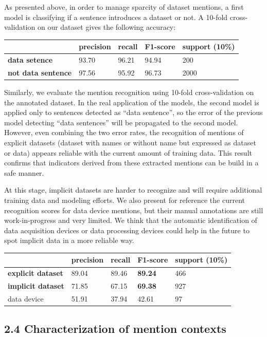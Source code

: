 \documentclass[
]{article}
\begin{document}
As presented above, in order to manage sparcity of dataset mentions, a
first model is classifying if a sentence introduces a dataset or not. A
10-fold cross-validation on our dataset gives the following accuracy:

\begin{longtable}[]{@{}lllll@{}}
\toprule
& precision & recall & \textbf{F1-score} & support (10\%)\tabularnewline
\midrule
\endhead
\textbf{data setence} & 93.70 & 96.21 & 94.94 & 200\tabularnewline
\textbf{not data sentence} & 97.56 & 95.92 & 96.73 & 2000\tabularnewline
\bottomrule
\end{longtable}

Similarly, we evaluate the mention recognition using 10-fold
cross-validation on the annotated dataset. In the real application of
the models, the second model is applied only to sentences detected as
``data sentence'', so the error of the previous model detecting ``data
sentences'' will be propagated to the second model. However, even
combining the two error rates, the recognition of mentions of explicit
datasets (dataset with names or without name but expressed as dataset or
data) appears reliable with the current amount of training data. This
result confirms that indicators derived from these extracted mentions
can be build in a safe manner.

At this stage, implicit datasets are harder to recognize and will
require additional training data and modeling efforts. We also present
for reference the current recognition scores for data device mentions,
but their manual annotations are still work-in-progress and very
limited. We think that the automatic identification of data acquisition
devices or data processing devices could help in the future to spot
implicit data in a more reliable way.

\begin{longtable}[]{@{}lllll@{}}
\toprule
& precision & recall & \textbf{F1-score} & support (10\%)\tabularnewline
\midrule
\endhead
\textbf{explicit dataset} & 89.04 & 89.46 & \textbf{89.24} &
466\tabularnewline
\textbf{implicit dataset} & 71.85 & 67.15 & \textbf{69.38} &
927\tabularnewline
data device & 51.91 & 37.94 & 42.61 & 97\tabularnewline
\bottomrule
\end{longtable}

\hypertarget{characterization-of-mention-contexts}{%
\subsection{2.4 Characterization of mention
contexts}\label{characterization-of-mention-contexts}}
\end{document}
